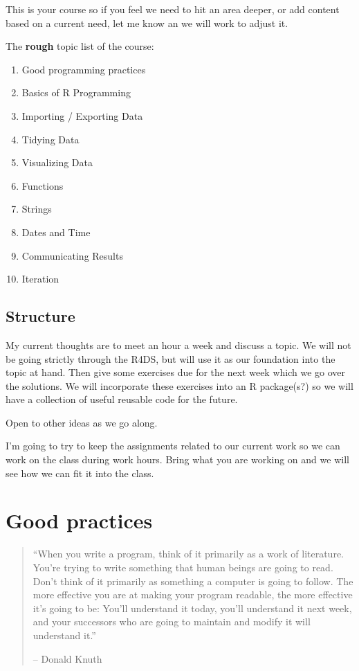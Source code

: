 \documentclass[]{book}
\providecommand{\tightlist}{%
  \setlength{\itemsep}{0pt}\setlength{\parskip}{0pt}}
\begin{document}
This is your course so if you feel we need to hit an area deeper, or add
content based on a current need, let me know an we will work to adjust
it.

The \textbf{rough} topic list of the course:

\begin{enumerate}
\def\labelenumi{\arabic{enumi}.}
\tightlist
\item
  Good programming practices
\item
  Basics of R Programming
\item
  Importing / Exporting Data
\item
  Tidying Data
\item
  Visualizing Data
\item
  Functions
\item
  Strings
\item
  Dates and Time
\item
  Communicating Results
\item
  Iteration
\end{enumerate}

\section{Structure}\label{structure}

My current thoughts are to meet an hour a week and discuss a topic. We
will not be going strictly through the R4DS, but will use it as our
foundation into the topic at hand. Then give some exercises due for the
next week which we go over the solutions. We will incorporate these
exercises into an R package(s?) so we will have a collection of useful
reusable code for the future.

Open to other ideas as we go along.

I'm going to try to keep the assignments related to our current work so
we can work on the class during work hours. Bring what you are working
on and we will see how we can fit it into the class.

\chapter{Good practices}\label{good-practices}

\begin{quote}
``When you write a program, think of it primarily as a work of
literature. You're trying to write something that human beings are going
to read. Don't think of it primarily as something a computer is going to
follow. The more effective you are at making your program readable, the
more effective it's going to be: You'll understand it today, you'll
understand it next week, and your successors who are going to maintain
and modify it will understand it.''

-- Donald Knuth
\end{quote}
\end{document}
